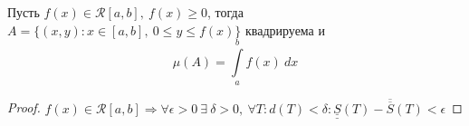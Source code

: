 \begin{theorem}
    Пусть $f(x)\in \mathcal{R}[a,b],\ f(x)\geq 0$, тогда $A=\{(x,y): x\in[a,b],\ 0\leq y\leq f(x)\}$ квадрируема и 
    \[\mu(A)=\int\limits_{a}^{b}f(x)\ dx\]
\end{theorem} 
\begin{proof}
    $f(x)\in \mathcal{R}[a,b] \Rightarrow \forall \epsilon>0\ \exists\ \delta>0,\ \forall T: d(T)<\delta: \underline{\underline{S}}(T)-\overline{\overline{S}}(T)<\epsilon$
\end{proof} 